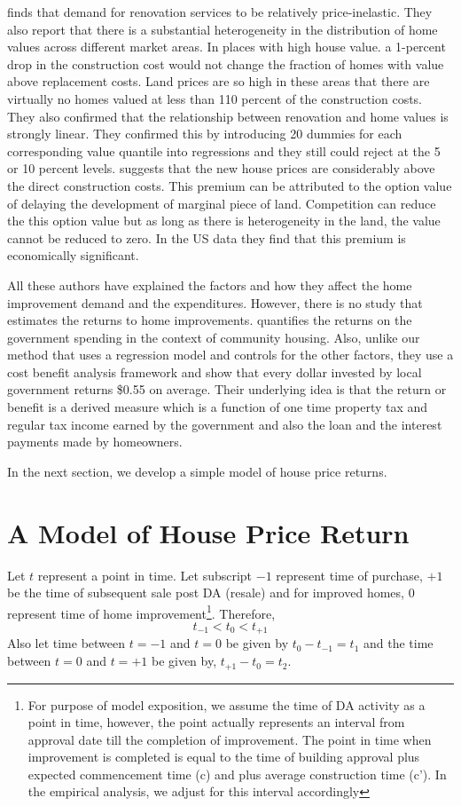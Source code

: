 \documentclass{article}
\begin{document}
\citet{gyourko2004reinvestment} finds that demand for renovation services to be relatively price-inelastic. They also report that there is a substantial heterogeneity in the distribution of home values across different market areas. In places with high house value. a 1-percent drop in the construction cost would not change the fraction of homes with value above replacement costs. Land prices are so high in these areas that there are virtually no homes valued at less than 110 percent of the construction costs. They also confirmed that the relationship between renovation and home values is strongly linear. They confirmed this by introducing 20 dummies for each corresponding value quantile into regressions and they still could reject at the 5 or 10 percent levels. \citet{guthrie2010house} suggests that the new house prices are considerably above the direct construction costs. This premium can be attributed to the option value of delaying the development of marginal piece of land. Competition can reduce the this option value but as long as there is heterogeneity in the land, the value cannot be reduced to zero. In the US data they find that this premium is economically significant.

All these authors have explained the factors and how they affect the home improvement demand and the expenditures. However, there is no study that estimates the returns to home improvements. \citet{simons2009housing} quantifies the returns on the government spending in the context of community housing. Also, unlike our method that uses a regression model and controls for the other factors, they use a cost benefit analysis framework and show that every dollar invested by local government returns \$0.55 on average. Their underlying idea is that the return or benefit is a derived measure which is a function of one time property tax and regular tax income earned by the government and also the loan and the interest payments made by homeowners.

In the next section, we develop a simple model of house price returns.


\section{A Model of House Price Return}

Let $t$ represent a point in time. Let subscript $-1$ represent time of purchase, $+1$ be the time of subsequent sale post DA (resale) and for improved homes, $0$ represent time of home improvement\footnote{For purpose of model exposition, we assume the time of DA activity as a point in time, however, the point actually represents an interval from approval date till the completion of improvement. The point in time when improvement is completed is equal to the time of building approval plus expected commencement time (c) and plus average construction time (c'). In the empirical analysis, we adjust for this interval accordingly}. Therefore, $$t_{-1} < t_0 < t_{+1}$$ Also let time between $t = -1$ and $t = 0$ be given by $t_{0} - t_{-1} = t_1$ and the time between $t = 0$ and $t = {+1}$ be given by, $ t_{+1} - t_{0} = t_2$.
\end{document}
